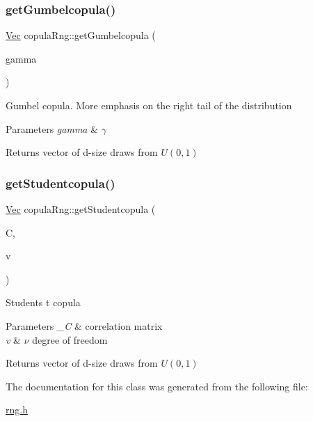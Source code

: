\subsubsection{\texorpdfstring{get\+Gumbelcopula()}{getGumbelcopula()}}
{\footnotesize\ttfamily \hyperlink{compute__returns__eigen_8h_a1eb6a9306ef406d7975f3cbf2e247777}{Vec} copula\+Rng\+::get\+Gumbelcopula (\begin{DoxyParamCaption}\item[{double}]{gamma }\end{DoxyParamCaption})}

Gumbel copula. More emphasis on the right tail of the distribution


\begin{DoxyParams}{Parameters}
{\em gamma} & $\gamma$ \\
\hline
\end{DoxyParams}
\begin{DoxyReturn}{Returns}
vector of d-\/size draws from $U(0,1)$ 
\end{DoxyReturn}
\hypertarget{classcopulaRng_a6d06b353f8c4eec06084919c254a8a40}{}\label{classcopulaRng_a6d06b353f8c4eec06084919c254a8a40} 
\subsubsection{\texorpdfstring{get\+Studentcopula()}{getStudentcopula()}}
{\footnotesize\ttfamily \hyperlink{compute__returns__eigen_8h_a1eb6a9306ef406d7975f3cbf2e247777}{Vec} copula\+Rng\+::get\+Studentcopula (\begin{DoxyParamCaption}\item[{Eigen\+::\+Matrix\+Xd}]{C,  }\item[{double}]{v }\end{DoxyParamCaption})}

Student\textquotesingle{}s t copula


\begin{DoxyParams}{Parameters}
{\em \+\_\+C} & correlation matrix \\
\hline
{\em v} & $\nu$ degree of freedom \\
\hline
\end{DoxyParams}
\begin{DoxyReturn}{Returns}
vector of d-\/size draws from $U(0,1)$ 
\end{DoxyReturn}


The documentation for this class was generated from the following file\+:\begin{DoxyCompactItemize}
\item 
\hyperlink{rng_8h}{rng.\+h}\end{DoxyCompactItemize}
